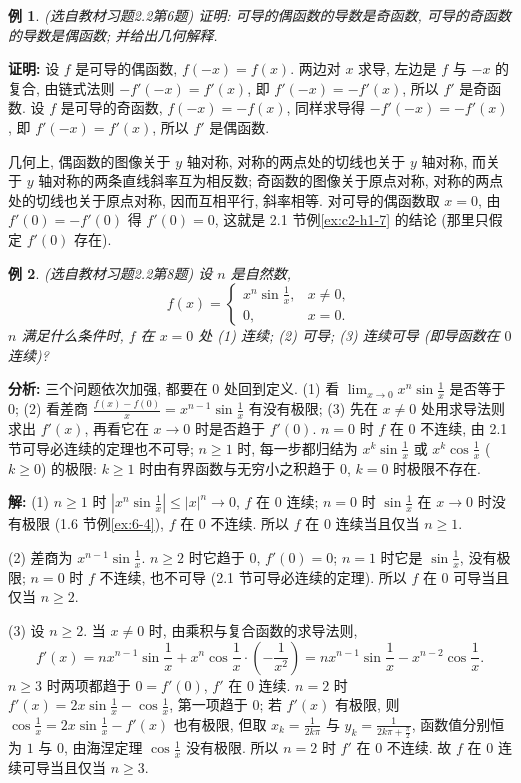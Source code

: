 \documentclass[UTF8,openany]{ctexbook}
\theoremstyle{chinesetextbook}
\newtheorem{example}{例}[section]
\newenvironment{cnproof}{\par\indent\textbf{证明:} \ignorespaces}{\par}
\newenvironment{cnsolution}{\par\indent\textbf{解:} \ignorespaces}{\par}
\begin{document}
\begin{example}\label{ex:c2-h2-6}
\textnormal{(选自教材习题2.2第6题)} 证明: 可导的偶函数的导数是奇函数, 可导的奇函数的导数是偶函数; 并给出几何解释.
\end{example}
\begin{cnproof}
设 $f$ 是可导的偶函数, $f(-x)=f(x)$. 两边对 $x$ 求导, 左边是 $f$ 与 $-x$ 的复合, 由链式法则 $-f'(-x)=f'(x)$, 即 $f'(-x)=-f'(x)$, 所以 $f'$ 是奇函数. 设 $f$ 是可导的奇函数, $f(-x)=-f(x)$, 同样求导得 $-f'(-x)=-f'(x)$, 即 $f'(-x)=f'(x)$, 所以 $f'$ 是偶函数.
\end{cnproof}
几何上, 偶函数的图像关于 $y$ 轴对称, 对称的两点处的切线也关于 $y$ 轴对称, 而关于 $y$ 轴对称的两条直线斜率互为相反数; 奇函数的图像关于原点对称, 对称的两点处的切线也关于原点对称, 因而互相平行, 斜率相等. 对可导的偶函数取 $x=0$, 由 $f'(0)=-f'(0)$ 得 $f'(0)=0$, 这就是 2.1 节例\ref{ex:c2-h1-7} 的结论 (那里只假定 $f'(0)$ 存在).
\begin{example}\label{ex:c2-h2-8}
\textnormal{(选自教材习题2.2第8题)} 设 $n$ 是自然数,
\[
f(x)=\begin{cases}x^n\sin\frac1x,&x\ne0,\\0,&x=0.\end{cases}
\]
$n$ 满足什么条件时, $f$ 在 $x=0$ 处 (1) 连续; (2) 可导; (3) 连续可导 (即导函数在 $0$ 连续)?
\end{example}
\par\indent\textbf{分析:} 三个问题依次加强, 都要在 $0$ 处回到定义. (1) 看 $\displaystyle\lim_{x\to0}x^n\sin\frac1x$ 是否等于 $0$; (2) 看差商 $\displaystyle\frac{f(x)-f(0)}x=x^{n-1}\sin\frac1x$ 有没有极限; (3) 先在 $x\ne0$ 处用求导法则求出 $f'(x)$, 再看它在 $x\to0$ 时是否趋于 $f'(0)$. $n=0$ 时 $f$ 在 $0$ 不连续, 由 2.1 节可导必连续的定理也不可导; $n\ge1$ 时, 每一步都归结为 $\displaystyle x^k\sin\frac1x$ 或 $\displaystyle x^k\cos\frac1x$ ($k\ge0$) 的极限: $k\ge1$ 时由有界函数与无穷小之积趋于 $0$, $k=0$ 时极限不存在.
\begin{cnsolution}
(1) $n\ge1$ 时 $\displaystyle\left|x^n\sin\frac1x\right|\le|x|^n\to0$, $f$ 在 $0$ 连续; $n=0$ 时 $\displaystyle\sin\frac1x$ 在 $x\to0$ 时没有极限 (1.6 节例\ref{ex:6-4}), $f$ 在 $0$ 不连续. 所以 $f$ 在 $0$ 连续当且仅当 $n\ge1$.

(2) 差商为 $\displaystyle x^{n-1}\sin\frac1x$. $n\ge2$ 时它趋于 $0$, $f'(0)=0$; $n=1$ 时它是 $\displaystyle\sin\frac1x$, 没有极限; $n=0$ 时 $f$ 不连续, 也不可导 (2.1 节可导必连续的定理). 所以 $f$ 在 $0$ 可导当且仅当 $n\ge2$.

(3) 设 $n\ge2$. 当 $x\ne0$ 时, 由乘积与复合函数的求导法则,
\[
f'(x)=nx^{n-1}\sin\frac1x+x^n\cos\frac1x\cdot\left(-\frac1{x^2}\right)=nx^{n-1}\sin\frac1x-x^{n-2}\cos\frac1x.
\]
$n\ge3$ 时两项都趋于 $0=f'(0)$, $f'$ 在 $0$ 连续. $n=2$ 时 $\displaystyle f'(x)=2x\sin\frac1x-\cos\frac1x$, 第一项趋于 $0$; 若 $f'(x)$ 有极限, 则 $\displaystyle\cos\frac1x=2x\sin\frac1x-f'(x)$ 也有极限, 但取 $\displaystyle x_k=\frac1{2k\pi}$ 与 $\displaystyle y_k=\frac1{2k\pi+\frac\pi2}$, 函数值分别恒为 $1$ 与 $0$, 由海涅定理 $\displaystyle\cos\frac1x$ 没有极限. 所以 $n=2$ 时 $f'$ 在 $0$ 不连续. 故 $f$ 在 $0$ 连续可导当且仅当 $n\ge3$.
\end{cnsolution}
\end{document}
